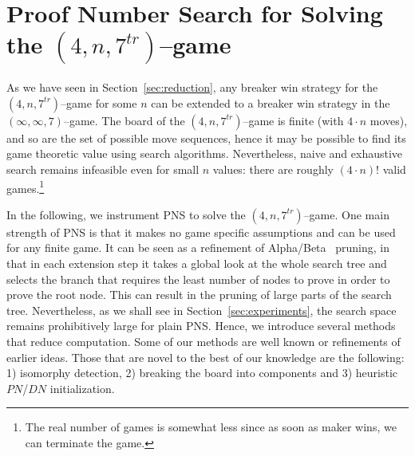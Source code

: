 \documentclass[conference]{IEEEtran}
\theoremstyle{definition}
\newcommand{\pn}{$PN$\xspace}
\newcommand{\dn}{$DN$\xspace}
\begin{document}



\section{Proof Number Search for Solving the $(4,n,7^{tr})$--game}
\label{sec:pns}

As we have seen in Section~\ref{sec:reduction}, any breaker win strategy for the $(4,n,7^{tr})$--game for some $n$ can be extended to a breaker win strategy in the $(\infty,\infty,7)$--game. The board of the $(4,n,7^{tr})$--game is finite (with $4 \cdot n$ moves), and so are the set of possible move sequences, hence it may be possible to find its game theoretic value using search algorithms. Nevertheless, naive and exhaustive search remains infeasible even for small $n$ values: there are roughly $(4 \cdot n)!$ valid games.\footnote{The real number of games is somewhat less since as soon as maker wins, we can terminate the game.} 

In the following, we instrument PNS to solve the $(4,n,7^{tr})$--game. One main strength of PNS is that it makes no game specific assumptions and can be used for any finite game. It can be seen as a refinement of Alpha/Beta~\cite{Bundy1984} pruning, in that in each extension step it takes a global look at the whole search tree and selects the branch that requires the least number of nodes to prove in order to prove the root node. This can result in the pruning of large parts of the search tree. Nevertheless, as we shall see in Section~\ref{sec:experiments}, the search space remains prohibitively large for plain PNS. Hence, we introduce several methods that reduce computation.
Some of our methods are well known or refinements of earlier ideas. Those that are novel to the best of our knowledge are the following: 1) isomorphy detection, 2) breaking the board into components and 3) heuristic \pn/\dn initialization. 
\end{document}
